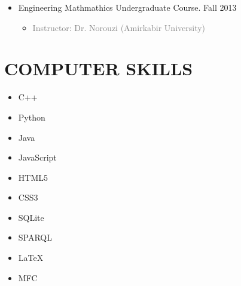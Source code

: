 \begin{itemize}
\begin{itemize}
		\item {} Engineering Mathmathics Undergraduate Course. \hfill Fall 2013
		\begin{itemize} 
			\item\textcolor{gray}{Instructor: Dr. Norouzi (Amirkabir University)} 
		\end{itemize}
	
	\end{itemize}
\end{itemize}

\section{COMPUTER SKILLS}

\begin{cvcolumns}
	{
		\vspace{-2em}
		\begin{multicols}{2}
	  	\begin{itemize}
	  		\item C++ 
	  		\item Python 
		  	\item Java
		  	\item JavaScript 
	  		\item HTML5 
	  		\item CSS3
	  		\item SQLite
	  		\item SPARQL
	  		\item \LaTeX 
	  		\item MFC   
	  		\end{itemize}
	  	\end{multicols}
  	}
  
    

 
\end{cvcolumns}

